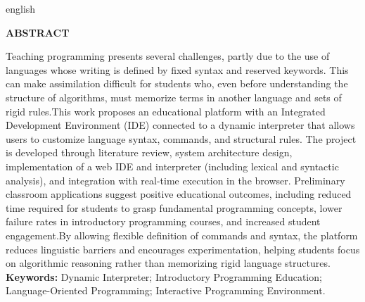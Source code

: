 \documentclass[
        oneside,      %
        english,			
        brazil			 
        ]{configcefetmglpd}
\begin{document}
 
\begin{abstract_cefetmg}
 \begin{otherlanguage*}{english}


\begin{center}
    \textbf{ABSTRACT} 
\end{center} 

Teaching programming presents several challenges, partly due to the use of languages whose writing is defined by fixed syntax and reserved keywords. This can make assimilation difficult for students who, even before understanding the structure of algorithms, must memorize terms in another language and sets of rigid rules.This work proposes an educational platform with an Integrated Development Environment (IDE) connected to a dynamic interpreter that allows users to customize language syntax, commands, and structural rules. The project is developed through literature review, system architecture design, implementation of a web IDE and interpreter (including lexical and syntactic analysis), and integration with real-time execution in the browser. Preliminary classroom applications suggest positive educational outcomes, including reduced time required for students to grasp fundamental programming concepts, lower failure rates in introductory programming courses, and increased student engagement.By allowing flexible definition of commands and syntax, the platform reduces linguistic barriers and encourages experimentation, helping students focus on algorithmic reasoning rather than memorizing rigid language structures.
\noindent
\textbf{Keywords:} Dynamic Interpreter; Introductory Programming Education; Language-Oriented Programming; Interactive Programming Environment.%

  \end{otherlanguage*}
\end{abstract_cefetmg}





\figvariadas   %
\listfigvariadas  %
\end{document}
